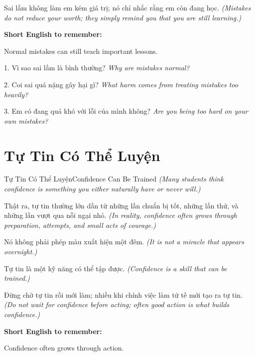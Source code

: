 \begin{baihoc}
Sai lầm không làm em kém giá trị; nó chỉ nhắc rằng em còn đang học.
\textit{(Mistakes do not reduce your worth; they simply remind you that you are still learning.)}
\end{baihoc}

\begin{ghinhoanh}
\textbf{Short English to remember:}

Normal mistakes can still teach important lessons.

\end{ghinhoanh}

\begin{tuhocnhanh}
1. Vì sao sai lầm là bình thường? \textit{Why are mistakes normal?}

2. Coi sai quá nặng gây hại gì? \textit{What harm comes from treating mistakes too heavily?}

3. Em có đang quá khó với lỗi của mình không? \textit{Are you being too hard on your own mistakes?}
\end{tuhocnhanh}
\ngancach

\section{Tự Tin Có Thể Luyện}
\begin{truyen}{Tự Tin Có Thể Luyện}{Confidence Can Be Trained}
\textit{(Many students think confidence is something you either naturally have or never will.)}

Thật ra, tự tin thường lớn dần từ những lần chuẩn bị tốt, những lần thử, và những lần vượt qua nỗi ngại nhỏ.
\textit{(In reality, confidence often grows through preparation, attempts, and small acts of courage.)}

Nó không phải phép màu xuất hiện một đêm.
\textit{(It is not a miracle that appears overnight.)}

Tự tin là một kỹ năng có thể tập được.
\textit{(Confidence is a skill that can be trained.)}
\end{truyen}

\begin{baihoc}
Đừng chờ tự tin rồi mới làm; nhiều khi chính việc làm tử tế mới tạo ra tự tin.
\textit{(Do not wait for confidence before acting; often good action is what builds confidence.)}
\end{baihoc}

\begin{ghinhoanh}
\textbf{Short English to remember:}

Confidence often grows through action.

\end{ghinhoanh}

